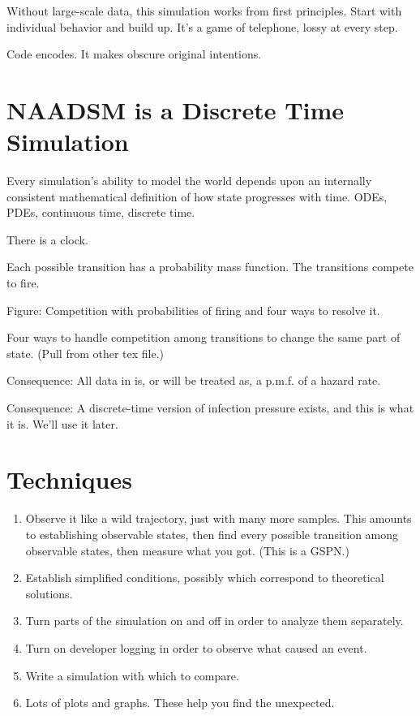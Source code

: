 \documentclass{article}
\begin{document}
Without large-scale data, this simulation works from first principles.
Start with individual behavior and build up.
It's a game of telephone, lossy at every step.

Code encodes. It makes obscure original intentions.

\section{NAADSM is a Discrete Time Simulation}

Every simulation's ability to model the world depends
upon an internally consistent mathematical definition
of how state progresses with time.
ODEs, PDEs, continuous time, discrete time.

There is a clock.

Each possible transition has a probability mass function.
The transitions compete to fire.

Figure: Competition with probabilities of firing and four
ways to resolve it.

Four ways to handle competition among transitions to
change the same part of state. (Pull from other tex file.)

Consequence: All data in is, or will be treated as, a p.m.f.
of a hazard rate.

Consequence: A discrete-time version of infection pressure
exists, and this is what it is. We'll use it later.


\section{Techniques}
\begin{enumerate}
  \item Observe it like a wild trajectory, just with many more samples.
        This amounts to establishing observable states, then find every
        possible transition among observable states, then measure
        what you got. (This is a GSPN.)
  \item Establish simplified conditions, possibly which correspond
        to theoretical solutions.
  \item Turn parts of the simulation on and off in order to analyze them
        separately.
  \item Turn on developer logging in order to observe what caused an event.
  \item Write a simulation with which to compare.
  \item Lots of plots and graphs. These help you find the unexpected.
\end{enumerate}
\end{document}
